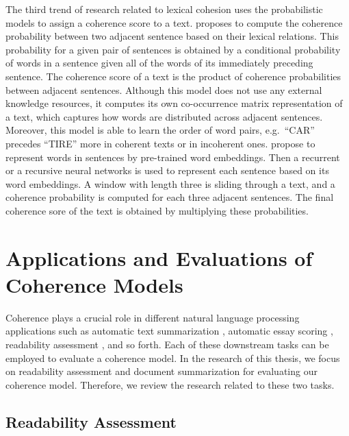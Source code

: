 The third trend of research related to lexical cohesion uses the probabilistic models to assign a coherence score to a text. 
 proposes to compute the coherence probability between two adjacent sentence based on their lexical relations. 
This probability for a given pair of sentences is obtained by a conditional probability of words in a sentence given all of the words of its immediately preceding sentence. 
The coherence score of a text is the product of coherence probabilities between adjacent sentences. 
Although this model does not use any external knowledge resources, it computes its own co-occurrence matrix representation of a  text, which captures how words are distributed across adjacent sentences. 
Moreover, this model is able to learn the order of word pairs, e.g.\ ``CAR'' precedes ``TIRE'' more in coherent texts or in incoherent ones.  
 propose to represent words in sentences by pre-trained word embeddings. 
Then a recurrent or a recursive neural networks is used to represent each sentence based on its word embeddings. 
A window with length three is sliding through a text, and a coherence probability is computed for each three adjacent sentences.  
The final coherence sore of the text is obtained by multiplying these probabilities. 

\section{Applications and Evaluations of Coherence Models}
\label{sec:rel-coh-applications}

Coherence plays a crucial role in different natural language processing applications such as automatic text summarization \cite{celikyilmaz11,linzhiheng12,fengvanessawei12a}, automatic essay scoring \cite{miltsakaki04a,higgins04,burstein10}, readability assessment \cite{pitler08,wangxinhao13}, and so forth.  
Each of these downstream tasks can be employed to evaluate a coherence model. 
In the research of this thesis, we focus on readability assessment and document summarization for evaluating our coherence model. 
Therefore, we review the research related to these two tasks. 

\subsection{Readability Assessment}

